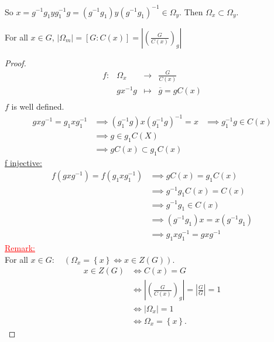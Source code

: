 So $x = g^{-1} g_1 y g_1^{-1}g = \left( g^{-1} g_1 \right) y \left( g^{-1}g_1 \right) ^{-1}\in   \Omega _{y}$. Then 
$\Omega _{x} \subset \Omega _{y}.$
\begin{theorem}[]
  For all $x \in   G $, $\left| \Omega _{m} \right|  = \left[ G: C(x)  \right]= \left| \left( \frac{G}{C(x) } \right) _{g} \right|   $ 
\end{theorem}
\begin{proof}
\[
\begin{array}{cccc}
      f : &  \Omega _{x}  & \longrightarrow & \frac{G}{C(x) } \\

           &  gx^{-1}g  & \longmapsto     & \overline{g} = g C(x)  \\ 
\end{array}
\]
$f $ is well defined.
\begin{align*}
  gxg^{-1} = g_1x g_1^{-1} & \implies 
  (g_1^{-1}g) x (g_1^{-1}g) ^{-1} = x & \implies 
  g_1^{-1} g \in  C(x)  \\ 
                                      & \implies g \in  g_1 C(X)  \\
                                      & \implies 
                                      g C(x)  \subset g_1 C(x) 
\end{align*}
\underline{f injective:}
\begin{align*}
  f(gxg^{-1})  = f(g_1 x g_1^{-1})  & \implies 
  gC(x)  = g_1C(x)  \\
                                    & \implies 
                                    g^{-1} g_1 C(x)  = C(x)  \\
                                    & \implies g^{-1}g_1 \in  C(x)  \\
                                    & \implies (g^{-1} g_1) x = x (g^{-1} g_1)  \\
                                    & \implies g_1 x g_1^{-1} = gxg^{-1}
\end{align*}
\noindent
\textcolor{red}{
\underline{
Remark:
}
}\\
For all $x \in   G: \quad \left( \Omega _{x} = \left\{ x \right\} \iff x \in  Z(G)   \right) $. 
\begin{align*}
  x \in   Z(G)  & \iff C(x)  = G \\
                & \iff \left| \left( \frac{G}{C(x) } \right) _{g} \right|   = 
                \left| \frac{G}{G} \right|   = 1 \\
                & \iff \left| \Omega _{x} \right|  = 1 \\
                & \iff \Omega _{x} = \left\{ x \right\}.
\end{align*}
\end{proof}
